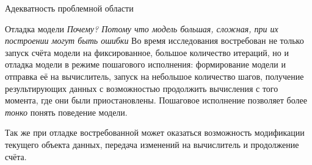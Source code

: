 \documentclass[a4paper,12pt]{extarticle}
\begin{document}
\begin{subsection}{Адекватность проблемной области}
    \begin{subsubsection}{Отладка модели}
        \textit{Почему? Потому что модель большая, сложная, при их построении могут быть ошибки} Во время исследования востребован не только запуск счёта модели на фиксированное, большое количество итераций, но и отладка модели в режиме пошагового исполнения: формирование модели и отправка её на вычислитель, запуск на небольшое количество шагов, получение результирующих данных с возможностью продолжить вычисления с того момента, где они были приостановлены. Пошаговое исполнение позволяет более \textit{тонко} понять поведение модели.
        
        Так же при отладке востребованной может оказаться возможность модификации текущего объекта данных, передача изменений на вычислитель и продолжение счёта.
    \end{subsubsection}

\end{subsection}
\end{document}
